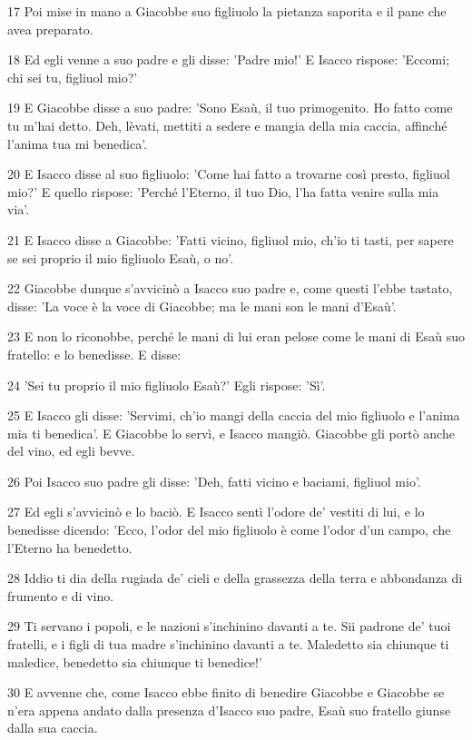 \par 17 Poi mise in mano a Giacobbe suo figliuolo la pietanza saporita e il pane che avea preparato.
\par 18 Ed egli venne a suo padre e gli disse: 'Padre mio!' E Isacco rispose: 'Eccomi; chi sei tu, figliuol mio?'
\par 19 E Giacobbe disse a suo padre: 'Sono Esaù, il tuo primogenito. Ho fatto come tu m'hai detto. Deh, lèvati, mettiti a sedere e mangia della mia caccia, affinché l'anima tua mi benedica'.
\par 20 E Isacco disse al suo figliuolo: 'Come hai fatto a trovarne così presto, figliuol mio?' E quello rispose: 'Perché l'Eterno, il tuo Dio, l'ha fatta venire sulla mia via'.
\par 21 E Isacco disse a Giacobbe: 'Fatti vicino, figliuol mio, ch'io ti tasti, per sapere se sei proprio il mio figliuolo Esaù, o no'.
\par 22 Giacobbe dunque s'avvicinò a Isacco suo padre e, come questi l'ebbe tastato, disse: 'La voce è la voce di Giacobbe; ma le mani son le mani d'Esaù'.
\par 23 E non lo riconobbe, perché le mani di lui eran pelose come le mani di Esaù suo fratello: e lo benedisse. E disse:
\par 24 'Sei tu proprio il mio figliuolo Esaù?' Egli rispose: 'Sì'.
\par 25 E Isacco gli disse: 'Servimi, ch'io mangi della caccia del mio figliuolo e l'anima mia ti benedica'. E Giacobbe lo servì, e Isacco mangiò. Giacobbe gli portò anche del vino, ed egli bevve.
\par 26 Poi Isacco suo padre gli disse: 'Deh, fatti vicino e baciami, figliuol mio'.
\par 27 Ed egli s'avvicinò e lo baciò. E Isacco sentì l'odore de' vestiti di lui, e lo benedisse dicendo: 'Ecco, l'odor del mio figliuolo è come l'odor d'un campo, che l'Eterno ha benedetto.
\par 28 Iddio ti dia della rugiada de' cieli e della grassezza della terra e abbondanza di frumento e di vino.
\par 29 Ti servano i popoli, e le nazioni s'inchinino davanti a te. Sii padrone de' tuoi fratelli, e i figli di tua madre s'inchinino davanti a te. Maledetto sia chiunque ti maledice, benedetto sia chiunque ti benedice!'
\par 30 E avvenne che, come Isacco ebbe finito di benedire Giacobbe e Giacobbe se n'era appena andato dalla presenza d'Isacco suo padre, Esaù suo fratello giunse dalla sua caccia.
